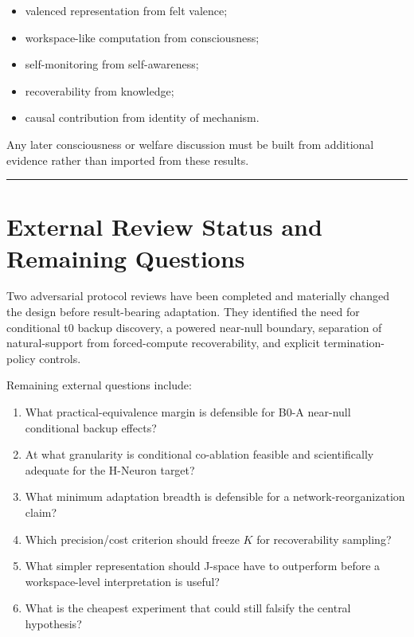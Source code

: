 \begin{itemize}
\tightlist
\item
  valenced representation from felt valence;
\item
  workspace-like computation from consciousness;
\item
  self-monitoring from self-awareness;
\item
  recoverability from knowledge;
\item
  causal contribution from identity of mechanism.
\end{itemize}

Any later consciousness or welfare discussion must be built from additional evidence rather than imported from these results.

\begin{center}\rule{0.5\linewidth}{0.5pt}\end{center}

\section{External Review Status and Remaining Questions}\label{external-review-questions}

Two adversarial protocol reviews have been completed and materially changed the design before result-bearing adaptation. They identified the need for conditional t0 backup discovery, a powered near-null boundary, separation of natural-support from forced-compute recoverability, and explicit termination-policy controls.

Remaining external questions include:

\begin{enumerate}
\tightlist
\item What practical-equivalence margin is defensible for B0-A near-null conditional backup effects?
\item At what granularity is conditional co-ablation feasible and scientifically adequate for the H-Neuron target?
\item What minimum adaptation breadth is defensible for a network-reorganization claim?
\item Which precision/cost criterion should freeze \(K\) for recoverability sampling?
\item What simpler representation should J-space have to outperform before a workspace-level interpretation is useful?
\item What is the cheapest experiment that could still falsify the central hypothesis?
\end{enumerate}


